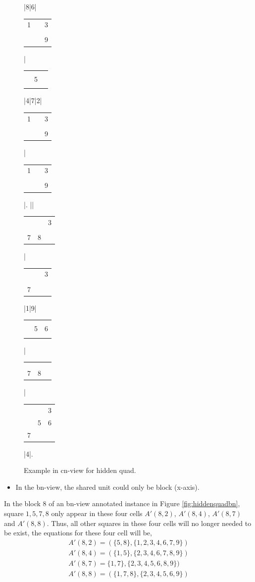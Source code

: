 \documentclass[11pt]{report}
\newcommand{\cell}[9]{%
\scriptsize
\setlength{\tabcolsep}{1pt}
\renewcommand{\arraystretch}{0.5}
\hspace{-0.6em}
\begin{tabular}{ccc}
#1 & #2 & #3\\
#4 & #5 & #6\\
#7 & #8 & #9
\end{tabular}
}
\newcommand{\set}[1]{\{ #1 \}}
\begin{document}
\begin{figure}[htbp]
\begin{sudoku}
|{8}|6|{\cell 1{}3{}{}{}{}{}9}|{\cell {}{}{}{}5{}{}{}{}}|4|7|2|{\cell 1{}3{}{}{}{}{}9}|{\cell 1{}3{}{}{}{}{}9}|.
|{\makebox[0pt]{\hspace{-2.1em}\large c9}{\cell {}2{}{}{}{}{}{}{}}}|{\cell {}{}3{}{}{}78{}}|{\cell {}{}3{}{}{}7{}{}}|1|9|{\cell {}{}{}{}56{}{}{}}|{\cell {}{}{}{}{}{}78{}}|{\cell {}{}3{}567{}{}}|4|.
\end{sudoku}
\caption{Example in cn-view for hidden quad.}
\label{fig:hiddenquadcn}
\end{figure}

\begin{itemize}
\item In the bn-view, the shared unit could only be block (x-axis).
\end{itemize}

In the block $8$ of an bn-view annotated instance in Figure \ref{fig:hiddenquadbn}, square $1, 5, 7, 8$ only appear in these four cells $A'(8,2)$,  $A'(8,4)$,  $A'(8,7)$ and $A'(8,8)$. Thus, all other squares in these four cells will no longer needed to be exist, the equations for these four cell will be,
\begin{eqnarray*}
A'(8,2) = (\set{5, 8}, \set{1, 2, 3, 4, 6, 7, 9})\\
A'(8,4) = (\set{1, 5}, \set{2, 3, 4, 6, 7, 8, 9})\\
A'(8,7) =  \set{1, 7}, \set{2, 3, 4, 5, 6, 8, 9})\\
A'(8,8) = (\set{1, 7, 8}, \set{2, 3, 4, 5, 6, 9})\\
\end{eqnarray*}
\end{document}
